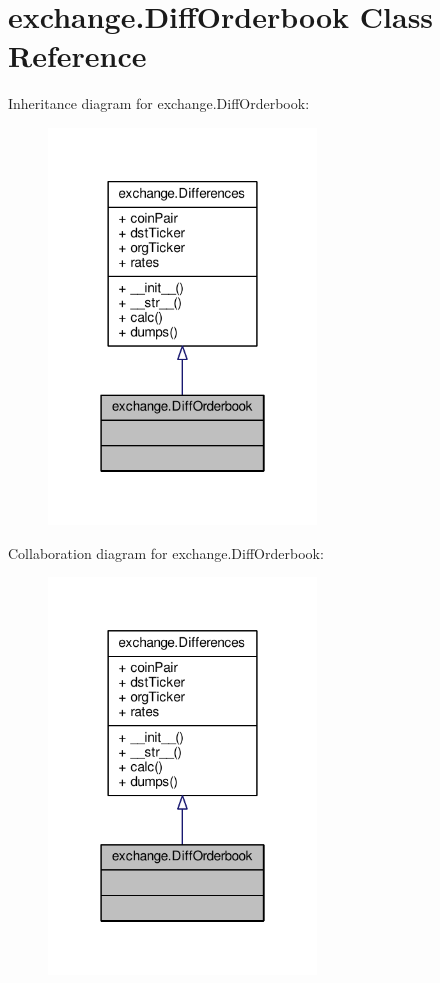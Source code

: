 \hypertarget{classexchange_1_1_diff_orderbook}{}\section{exchange.\+Diff\+Orderbook Class Reference}
\label{classexchange_1_1_diff_orderbook}


Inheritance diagram for exchange.\+Diff\+Orderbook\+:
\nopagebreak
\begin{figure}[H]
\begin{center}
\leavevmode
\includegraphics[width=202pt]{classexchange_1_1_diff_orderbook__inherit__graph}
\end{center}
\end{figure}


Collaboration diagram for exchange.\+Diff\+Orderbook\+:
\nopagebreak
\begin{figure}[H]
\begin{center}
\leavevmode
\includegraphics[width=202pt]{classexchange_1_1_diff_orderbook__coll__graph}
\end{center}
\end{figure}
